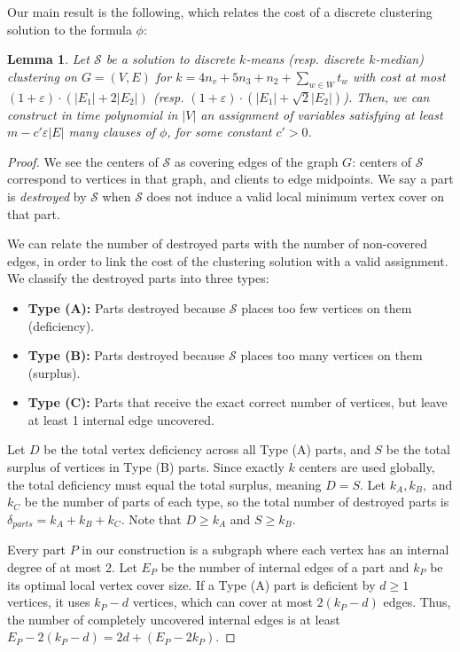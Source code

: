 \documentclass[11pt]{article}
\newtheorem{lemma}[theorem]{Lemma}
\newcommand{\eps}{\varepsilon}
\newcommand{\calS}{\mathcal {S}}
\begin{document}
Our main result is the following, which relates the cost of a discrete clustering solution to the formula $\phi$:
\begin{lemma}\label{lem:decodeD}
Let $\calS$ be a solution to discrete $k$-means (resp. discrete $k$-median) clustering on $G=(V, E)$ for $k = 4n_v + 5n_3 + n_2 + \sum_{w \in W} t_w$ with cost at most $(1+\eps)\cdot (|E_1| + 2|E_2|)$ (resp. $(1+\eps)\cdot (|E_1| + \sqrt{2}|E_2|)$). Then, we can construct in time polynomial in $|V|$ an assignment of variables satisfying at least $m - c'\eps|E|$ many clauses of $\phi$, for some constant $c' > 0$.
\end{lemma}
\begin{proof}
We see the centers of $\calS$ as covering edges of the graph $G$: centers of $\calS$ correspond to vertices in that graph, and clients to edge midpoints.
We say a part is \emph{destroyed} by $\calS$ when $\calS$ does not induce a valid local minimum vertex cover on that part. 

We can relate the number of destroyed parts with the number of non-covered edges, in order to link the cost of the clustering solution with a valid assignment. We classify the destroyed parts into three types:
\begin{itemize}
    \item \textbf{Type (A):} Parts destroyed because $\calS$ places too few vertices on them (deficiency).
    \item \textbf{Type (B):} Parts destroyed because $\calS$ places too many vertices on them (surplus).
    \item \textbf{Type (C):} Parts that receive the exact correct number of vertices, but leave at least 1 internal edge uncovered.
\end{itemize}

Let $D$ be the total vertex deficiency across all Type (A) parts, and $S$ be the total surplus of vertices in Type (B) parts. Since exactly $k$ centers are used globally, the total deficiency must equal the total surplus, meaning $D = S$. Let $k_A, k_B,$ and $k_C$ be the number of parts of each type, so the total number of destroyed parts is $\delta_{parts} = k_A + k_B + k_C$. Note that $D \ge k_A$ and $S \ge k_B$.


Every part $P$ in our construction is a subgraph where each vertex has an internal degree of at most 2. Let $E_P$ be the number of internal edges of a part and $k_P$ be its optimal local vertex cover size. If a Type (A) part is deficient by $d \ge 1$ vertices, it uses $k_P - d$ vertices, which can cover at most $2(k_P - d)$ edges. Thus, the number of completely uncovered internal edges is at least $E_P - 2(k_P - d) = 2d + (E_P - 2k_P)$. 


\end{proof}
\end{document}
